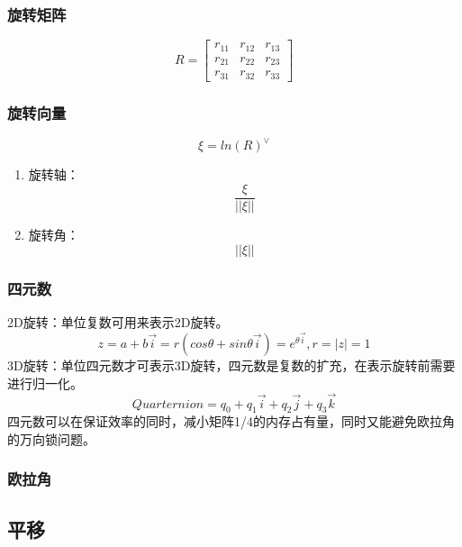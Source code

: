 \subsubsection{旋转矩阵} 
\begin{equation}
R =  \begin{bmatrix} r_{11} &  r_{12} & r_{13} \\  r_{21} & r_{22} & r_{23} \\ r_{31} & r_{32} & r_{33} \end{bmatrix} 
\end{equation}

\subsubsection{旋转向量} 
\begin{equation} \xi = ln(R)^{\vee} \end{equation}
\begin{enumerate}
\item 旋转轴：\begin{equation} \frac{\xi}{||\xi||}  \end{equation}
\item 旋转角：\begin{equation} ||\xi||  \end{equation}
\end{enumerate}

\subsubsection{四元数} 
2D旋转：单位复数可用来表示2D旋转。  \\
\begin{equation} 
z = a + b\vec{i} = r ( cos\theta + sin\theta\vec{i} ) = e^{\theta \vec{i}}, r = |z| = 1
\end{equation}
3D旋转：单位四元数才可表示3D旋转，四元数是复数的扩充，在表示旋转前需要进行归一化。 \\
\begin{equation} 
Quarternion = q_0 + q_1\vec{i} + q_2\vec{j} + q_3\vec{k}  
\end{equation} 
四元数可以在保证效率的同时，减小矩阵1/4的内存占有量，同时又能避免欧拉角的万向锁问题。

\subsubsection{欧拉角} 


\subsection{平移}

